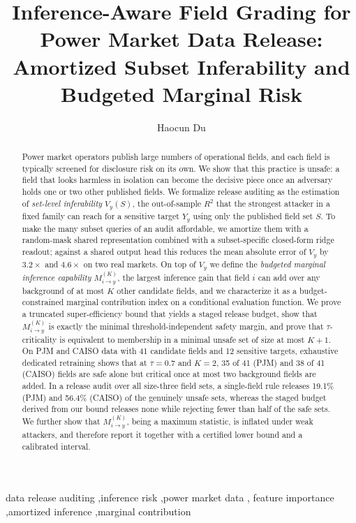 \documentclass[preprint,12pt]{elsarticle}
\newcommand{\Vy}{V_{y}}
\newcommand{\Mik}{M^{(K)}_{i \to y}}
\newcommand{\Rtwo}{R^{2}}
\begin{document}
\begin{frontmatter}

\title{Inference-Aware Field Grading for Power Market Data Release:\\
Amortized Subset Inferability and Budgeted Marginal Risk}

\author{Haocun Du}
\address{(affiliation to be completed)}

\begin{abstract}
Power market operators publish large numbers of operational fields, and each field is
typically screened for disclosure risk on its own. We show that this practice is unsafe:
a field that looks harmless in isolation can become the decisive piece once an adversary
holds one or two other published fields. We formalize release auditing as the estimation
of \emph{set-level inferability} $\Vy(S)$, the out-of-sample $\Rtwo$ that the strongest
attacker in a fixed family can reach for a sensitive target $Y_y$ using only the published
field set $S$. To make the many subset queries of an audit affordable, we amortize them
with a random-mask shared representation combined with a subset-specific closed-form ridge
readout; against a shared output head this reduces the mean absolute error of $\Vy$ by
$3.2\times$ and $4.6\times$ on two real markets. On top of $\Vy$ we define the
\emph{budgeted marginal inference capability} $\Mik$, the largest inference gain that
field $i$ can add over any background of at most $K$ other candidate fields, and we
characterize it as a budget-constrained marginal contribution index on a conditional
evaluation function. We prove a truncated super-efficiency bound that yields a staged
release budget, show that $\Mik$ is exactly the minimal threshold-independent safety
margin, and prove that $\tau$-criticality is equivalent to membership in a minimal unsafe
set of size at most $K+1$. On PJM and CAISO data with 41 candidate fields and 12 sensitive
targets, exhaustive dedicated retraining shows that at $\tau=0.7$ and $K=2$, 35 of 41 (PJM)
and 38 of 41 (CAISO) fields are safe alone but critical once at most two background fields
are added. In a release audit over all size-three field sets, a single-field rule releases
19.1\% (PJM) and 56.4\% (CAISO) of the genuinely unsafe sets, whereas the staged budget
derived from our bound releases none while rejecting fewer than half of the safe sets.
We further show that $\Mik$, being a maximum statistic, is inflated under weak attackers,
and therefore report it together with a certified lower bound and a calibrated interval.
\end{abstract}

\begin{keyword}
data release auditing \sep inference risk \sep power market data \sep
feature importance \sep amortized inference \sep marginal contribution
\end{keyword}

\end{frontmatter}
\end{document}
